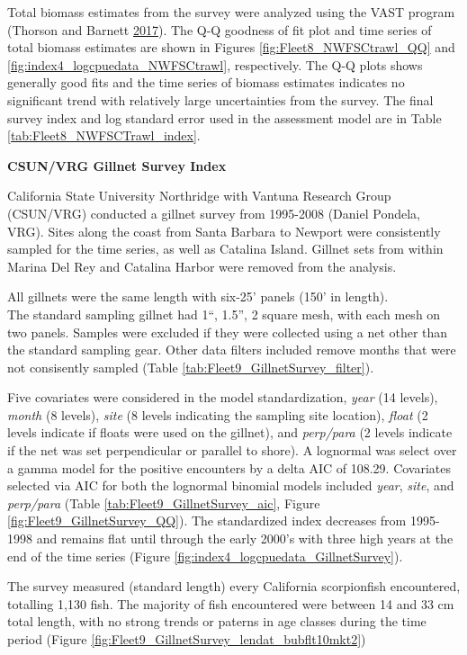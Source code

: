\documentclass[12pt,]{article}
\begin{document}
Total biomass estimates from the survey were analyzed using the VAST
program (Thorson and Barnett \protect\hyperlink{ref-Thorson2017}{2017}).
The Q-Q goodness of fit plot and time series of total biomass estimates
are shown in Figures \ref{fig:Fleet8_NWFSCtrawl_QQ} and
\ref{fig:index4_logcpuedata_NWFSCtrawl}, respectively. The Q-Q plots
shows generally good fits and the time series of biomass estimates
indicates no significant trend with relatively large uncertainties from
the survey. The final survey index and log standard error used in the
assessment model are in Table \ref{tab:Fleet8_NWFSCTrawl_index}.

\textbf{CSUN/VRG Gillnet Survey Index}

California State University Northridge with Vantuna Research Group
(CSUN/VRG) conducted a gillnet survey from 1995-2008 (Daniel Pondela,
VRG). Sites along the coast from Santa Barbara to Newport were
consistently sampled for the time series, as well as Catalina Island.
Gillnet sets from within Marina Del Rey and Catalina Harbor were removed
from the analysis.

All gillnets were the same length with six-25' panels (150' in
length).\\
The standard sampling gillnet had 1``, 1.5'', 2 square mesh, with each
mesh on two panels. Samples were excluded if they were collected using a
net other than the standard sampling gear. Other data filters included
remove months that were not consisently sampled (Table
\ref{tab:Fleet9_GillnetSurvey_filter}).

Five covariates were considered in the model standardization,
\emph{year} (14 levels), \emph{month} (8 levels), \emph{site} (8 levels
indicating the sampling site location), \emph{float} (2 levels indicate
if floats were used on the gillnet), and \emph{perp/para} (2 levels
indicate if the net was set perpendicular or parallel to shore). A
lognormal was select over a gamma model for the positive encounters by a
delta AIC of 108.29. Covariates selected via AIC for both the lognormal
binomial models included \emph{year}, \emph{site}, and \emph{perp/para}
(Table \ref{tab:Fleet9_GillnetSurvey_aic}, Figure
\ref{fig:Fleet9_GillnetSurvey_QQ}). The standardized index decreases
from 1995-1998 and remains flat until through the early 2000's with
three high years at the end of the time series (Figure
\ref{fig:index4_logcpuedata_GillnetSurvey}).

The survey measured (standard length) every California scorpionfish
encountered, totalling 1,130 fish. The majority of fish encountered were
between 14 and 33 cm total length, with no strong trends or paterns in
age classes during the time period (Figure
\ref{fig:Fleet9_GillnetSurvey_lendat_bubflt10mkt2})
\end{document}
